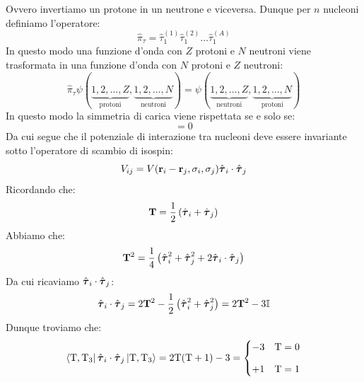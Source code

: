 Ovvero invertiamo un protone in un neutrone e viceversa. Dunque per $n$ nucleoni definiamo l'operatore:
\begin{equation}
 \hat{\pi}_\tau = \hat{\tau}_1^{(1)}\hat{\tau}_1^{(2)}\dots\hat{\tau}_1^{(A)}
\end{equation}
In questo modo una funzione d'onda con $Z$ protoni e $N$ neutroni viene trasformata in una funzione d'onda con $N$ protoni e $Z$ neutroni:
\begin{equation}
 \hat{\pi}_\tau \psi(\underbrace{1,2,\dots,Z}_{\text{protoni}},\underbrace{1,2,\dots,N}_{\text{neutroni}}) = \psi(\underbrace{1,2,\dots,Z}_{\text{neutroni}},\underbrace{1,2,\dots,N}_{\text{protoni}})
\end{equation}
In questo modo la simmetria di carica viene rispettata se e solo se:
\begin{equation}
  [\hat{\pi}_\tau, \op{H}] = 0
\end{equation}
Da cui segue che il potenziale di interazione tra nucleoni deve essere invariante sotto l'operatore di scambio di isospin:
\begin{equation}
  V_{ij} = V(\vb{r}_i - \vb{r}_j, \sigma_i, \sigma_j)\hat{\boldsymbol{\tau}}_i \cdot \hat{\boldsymbol{\tau}}_j
\end{equation}
Ricordando che:
\begin{equation}
  \vb{T} = \dfrac{1}{2} \left(\hat{\boldsymbol{\tau}}_i + \hat{\boldsymbol{\tau}}_j\right)
\end{equation}
Abbiamo che:
\begin{equation}
  \vb{T}^2 = \dfrac{1}{4} \left(\hat{\boldsymbol{\tau}}_i^2 + \hat{\boldsymbol{\tau}}_j^2 + 2 \hat{\boldsymbol{\tau}}_i \cdot \hat{\boldsymbol{\tau}}_j\right)
\end{equation}
Da cui ricaviamo $ \hat{\boldsymbol{\tau}}_i \cdot \hat{\boldsymbol{\tau}}_j$:
\begin{equation}
  \hat{\boldsymbol{\tau}}_i \cdot \hat{\boldsymbol{\tau}}_j = 2 \vb{T}^2 - \dfrac{1}{2}\left(\hat{\boldsymbol{\tau}}_i^2 + \hat{\boldsymbol{\tau}}_j^2\right) = 2 \vb{T}^2 - 3\mathbb{I}
\end{equation}
Dunque troviamo che:
\begin{equation}
  \bra{\text{T},\text{T}_3} \hat{\boldsymbol{\tau}}_i \cdot \hat{\boldsymbol{\tau}}_j \ket{\text{T},\text{T}_3} = 2 \text{T}(\text{T}+1) - 3 = \begin{cases}
    -3 & \text{T}=0 \\[8pt]
    +1 & \text{T}=1
  \end{cases}
\end{equation}
